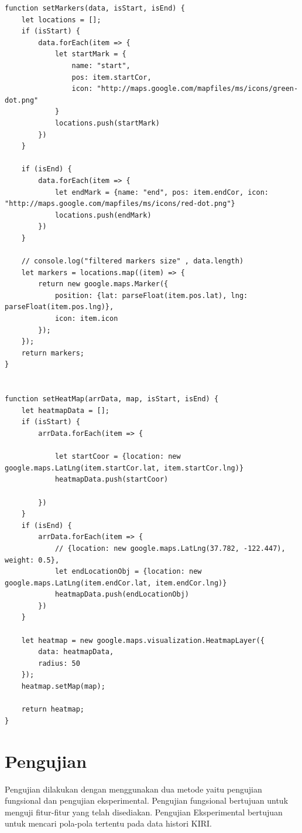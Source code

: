 \begin{enumerate}
\begin{lstlisting}[label=map_input , caption=Map Input]
function setMarkers(data, isStart, isEnd) {
    let locations = [];
    if (isStart) {
        data.forEach(item => {
            let startMark = {
                name: "start",
                pos: item.startCor,
                icon: "http://maps.google.com/mapfiles/ms/icons/green-dot.png"
            }
            locations.push(startMark)
        })
    }

    if (isEnd) {
        data.forEach(item => {
            let endMark = {name: "end", pos: item.endCor, icon: "http://maps.google.com/mapfiles/ms/icons/red-dot.png"}
            locations.push(endMark)
        })
    }

    // console.log("filtered markers size" , data.length)
    let markers = locations.map((item) => {
        return new google.maps.Marker({
            position: {lat: parseFloat(item.pos.lat), lng: parseFloat(item.pos.lng)},
            icon: item.icon
        });
    });
    return markers;
}


function setHeatMap(arrData, map, isStart, isEnd) {
    let heatmapData = [];
    if (isStart) {
        arrData.forEach(item => {

            let startCoor = {location: new google.maps.LatLng(item.startCor.lat, item.startCor.lng)}
            heatmapData.push(startCoor)

        })
    }
    if (isEnd) {
        arrData.forEach(item => {
            // {location: new google.maps.LatLng(37.782, -122.447), weight: 0.5},
            let endLocationObj = {location: new google.maps.LatLng(item.endCor.lat, item.endCor.lng)}
            heatmapData.push(endLocationObj)
        })
    }

    let heatmap = new google.maps.visualization.HeatmapLayer({
        data: heatmapData,
        radius: 50
    });
    heatmap.setMap(map);

    return heatmap;
}

\end{lstlisting}
\end{enumerate}

\section{Pengujian}
\label{sec:pengujian}
Pengujian dilakukan dengan menggunakan dua metode yaitu pengujian fungsional dan pengujian eksperimental. Pengujian fungsional bertujuan untuk menguji fitur-fitur yang telah disediakan. Pengujian Eksperimental bertujuan untuk mencari pola-pola tertentu pada data histori KIRI.


